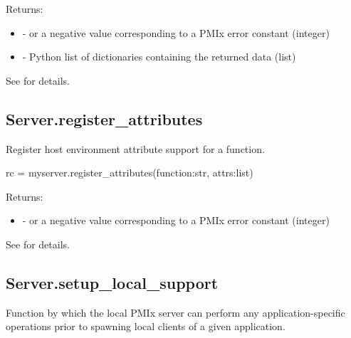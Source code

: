 Returns:

\begin{itemize}
    \item {} -  or a negative value corresponding to a PMIx error constant (integer)
    \item {} - Python list of  dictionaries containing the returned data (list)
\end{itemize}

See  for details.


\subsection{Server.register_attributes}

\summary
Register host environment attribute support for a function.

\format

\pyspecificstart
\begin{codepar}
rc = myserver.register_attributes(function:str, attrs:list)
\end{codepar}
\pyspecificend


\begin{arglist}
\end{arglist}

Returns:

\begin{itemize}
    \item {} -  or a negative value corresponding to a PMIx error constant (integer)
\end{itemize}

See  for details.


\subsection{Server.setup_local_support}

\summary
Function by which the local \ac{PMIx} server can perform any application-specific operations prior to spawning local clients of a given application.

